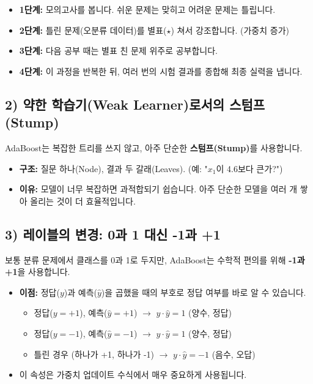 \documentclass[11pt,a4paper]{book}
\theoremstyle{definition}
\begin{document}
\begin{itemize}
    \item \textbf{1단계:} 모의고사를 봅니다. 쉬운 문제는 맞히고 어려운 문제는 틀립니다.
    \item \textbf{2단계:} 틀린 문제(오분류 데이터)를 별표($\star$) 쳐서 강조합니다. (가중치 증가)
    \item \textbf{3단계:} 다음 공부 때는 별표 친 문제 위주로 공부합니다.
    \item \textbf{4단계:} 이 과정을 반복한 뒤, 여러 번의 시험 결과를 종합해 최종 실력을 냅니다.
\end{itemize}

\subsection{2) 약한 학습기(Weak Learner)로서의 스텀프(Stump)}
AdaBoost는 복잡한 트리를 쓰지 않고, 아주 단순한 \textbf{스텀프(Stump)}를 사용합니다.
\begin{itemize}
    \item \textbf{구조:} 질문 하나(Node), 결과 두 갈래(Leaves). (예: "$x_1$이 4.6보다 큰가?")
    \item \textbf{이유:} 모델이 너무 복잡하면 과적합되기 쉽습니다. 아주 단순한 모델을 여러 개 쌓아 올리는 것이 더 효율적입니다.
\end{itemize}

\subsection{3) 레이블의 변경: 0과 1 대신 -1과 +1}
보통 분류 문제에서 클래스를 0과 1로 두지만, AdaBoost는 수학적 편의를 위해 \textbf{-1과 +1}을 사용합니다.
\begin{itemize}
    \item \textbf{이점:} 정답($y$)과 예측($\hat{y}$)을 곱했을 때의 부호로 정답 여부를 바로 알 수 있습니다.
    \begin{itemize}
        \item 정답($y=+1$), 예측($\hat{y}=+1$) $\rightarrow$ $y \cdot \hat{y} = 1$ (양수, 정답)
        \item 정답($y=-1$), 예측($\hat{y}=-1$) $\rightarrow$ $y \cdot \hat{y} = 1$ (양수, 정답)
        \item 틀린 경우 (하나가 +1, 하나가 -1) $\rightarrow$ $y \cdot \hat{y} = -1$ (음수, 오답)
    \end{itemize}
    \item 이 속성은 가중치 업데이트 수식에서 매우 중요하게 사용됩니다.
\end{itemize}
\end{document}
